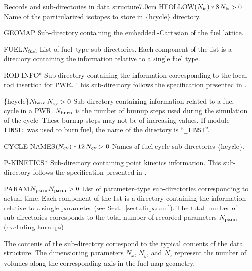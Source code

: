 \begin{DescriptionEnregistrement}{Records and sub-directories
 in  data structure}{7.0cm}
\OptCharEnr
  {HFOLLOW}{$(N_{\rm is})*8$}{$N_{\rm is}>0$}
  {Name of the particularized isotopes to store in \{hcycle\} directory.}
   
\DirEnr
 {GEOMAP}
 {Sub-directory containing the embedded -Cartesian  of the fuel lattice.}

\DirlEnr
  {FUEL}{$N_{\rm fuel}$}
  {List of fuel--type sub-directories. Each component of the list is a directory containing
   the information relative to a single fuel type.}
   
\OptDirEnr
 {ROD-INFO}{*}
 {Sub-directory containing the information corresponding to the local rod insertion for PWR.
  This sub-directory follows the specification presented in .}
          
\OptDirlEnr
 {\{hcycle\}}{$N_{\rm burn}$}{$N_{\rm cy}> 0$}
 {Sub-directory containing information related to a fuel cycle in a PWR. $N_{\rm burn}$ is the number of burnup steps used during
 the simulation of the cycle. These burnup steps may not be of increasing values. If module {\tt TINST:} was used to burn fuel, the
 name of the  directory is ``{\tt \_TINST}''.}

\OptCharEnr
 {CYCLE-NAMES}{$(N_{\rm cy})*12$}{$N_{\rm cy}>0$}
 {Names of fuel cycle sub-directories \{hcycle\}.}
   
\OptDirEnr
 {P-KINETICS}{*}
 {Sub-directory containing point kinetics information.
  This sub-directory follows the specification presented in .}

\OptDirlEnr
  {PARAM}{$N_{\rm parm}$}{$N_{\rm parm}>0$}
  {List of parameter--type sub-directories corresponding to actual time. Each component of the list is a directory
   containing the information relative to a single parameter (see Sect.~\ref{sect:dirparam}). The total number of sub-directories
   corresponds to the total number of recorded parameters $N_{\rm parm}$ (excluding  burnups).}

\end{DescriptionEnregistrement}

\noindent The contents of the  sub-directory correspond to the typical
contents of the  data structure.
The dimensioning parameters $N_x$, $N_y$, and $N_z$ represent the number
of volumes along the corresponding axis in the fuel-map geometry.\\

